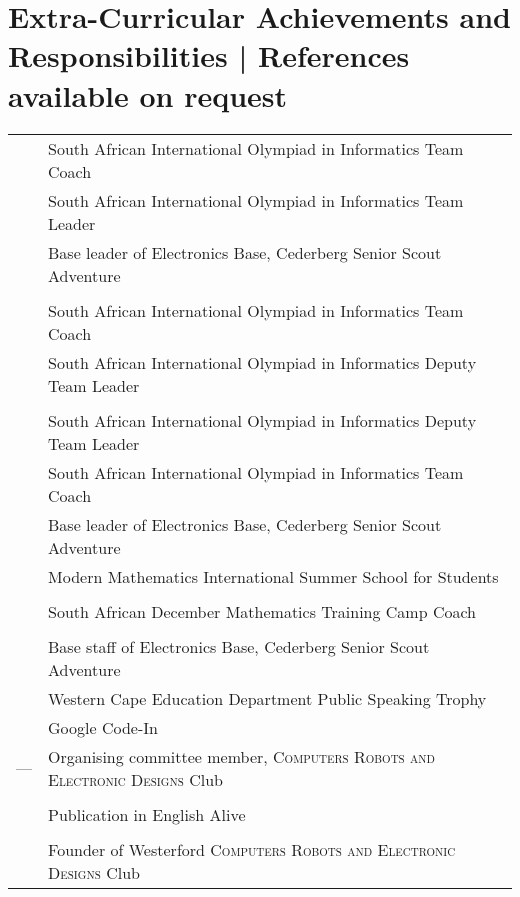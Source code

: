 \section{Extra-Curricular Achievements and Responsibilities \footnotesize | References available on request}

\begin{tabular}{R{2.5cm}|l}
            & South African International Olympiad in Informatics Team Coach\\
                    & South African International Olympiad in Informatics Team Leader\\
                    & Base leader of Electronics Base, Cederberg Senior Scout Adventure\\
                    & \\
            & South African International Olympiad in Informatics Team Coach\\
                    & South African International Olympiad in Informatics Deputy Team Leader\\
                    & \\
            & South African International Olympiad in Informatics Deputy Team Leader\\
                    & South African International Olympiad in Informatics Team Coach\\
                    & Base leader of Electronics Base, Cederberg Senior Scout Adventure\\
                    & Modern Mathematics International Summer School for Students\\
                    & \\
            & South African December Mathematics Training Camp Coach\\
                    & \\
            & Base staff of Electronics Base, Cederberg Senior Scout Adventure\\
                    & Western Cape Education Department Public Speaking Trophy\\
                    & Google Code-In\\
 ---  & Organising committee member, \textsc{Computers Robots and Electronic Designs} Club\\
                    & \\
            & Publication in English Alive\\
                    & \\
            & Founder of Westerford \textsc{Computers Robots and Electronic Designs} Club\\
\end{tabular}

